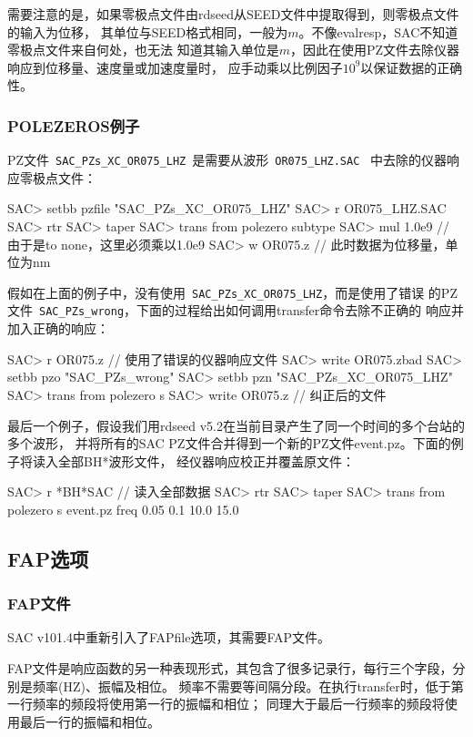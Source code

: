 需要注意的是，如果零极点文件由rdseed从SEED文件中提取得到，则零极点文件的输入为位移，
其单位与SEED格式相同，一般为$m$。不像evalresp，SAC不知道零极点文件来自何处，也无法
知道其输入单位是$m$，因此在使用PZ文件去除仪器响应到位移量、速度量或加速度量时，
应手动乘以比例因子$10^9$以保证数据的正确性。

\subsubsection{POLEZEROS例子}
PZ文件~\verb+SAC_PZs_XC_OR075_LHZ+~是需要从波形~\verb+OR075_LHZ.SAC+~
中去除的仪器响应零极点文件：
\begin{SACCode}
SAC> setbb pzfile "SAC_PZs_XC_OR075_LHZ"
SAC> r OR075_LHZ.SAC
SAC> rtr
SAC> taper
SAC> trans from polezero subtype %
SAC> mul 1.0e9          // 由于是to none，这里必须乘以1.0e9
SAC> w OR075.z          // 此时数据为位移量，单位为nm
\end{SACCode}

假如在上面的例子中，没有使用~\verb+SAC_PZs_XC_OR075_LHZ+，而是使用了错误
的PZ文件~\verb+SAC_PZs_wrong+，下面的过程给出如何调用transfer命令去除不正确的
响应并加入正确的响应：
\begin{SACCode}
SAC> r OR075.z                  // 使用了错误的仪器响应文件
SAC> write OR075.zbad
SAC> setbb pzo "SAC_PZs_wrong"
SAC> setbb pzn "SAC_PZs_XC_OR075_LHZ"
SAC> trans from polezero s %
SAC> write OR075.z              // 纠正后的文件
\end{SACCode}

最后一个例子，假设我们用rdseed v5.2在当前目录产生了同一个时间的多个台站的多个波形，
并将所有的SAC PZ文件合并得到一个新的PZ文件event.pz。下面的例子将读入全部BH*波形文件，
经仪器响应校正并覆盖原文件：
\begin{SACCode}
SAC> r *BH*SAC          // 读入全部数据
SAC> rtr
SAC> taper
SAC> trans from polezero s event.pz freq 0.05 0.1 10.0 15.0
\end{SACCode}

\subsection{FAP选项}
\subsubsection{FAP文件}
SAC v101.4中重新引入了FAPfile选项，其需要FAP文件。

FAP文件是响应函数的另一种表现形式，其包含了很多记录行，每行三个字段，分别是频率(HZ)、振幅及相位。
频率不需要等间隔分段。在执行transfer时，低于第一行频率的频段将使用第一行的振幅和相位；
同理大于最后一行频率的频段将使用最后一行的振幅和相位。

